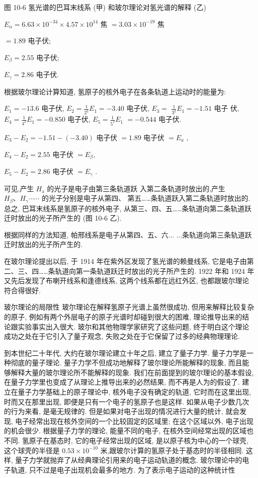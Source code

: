 \documentclass[10pt]{article}
\begin{document}
图 10-6 氢光谱的巴耳末线系 (甲) 和玻尔理论对氢光谱的解释 (乙)

\({E}_{\alpha } = {6.63} \times {10}^{-{34}} \times {4.57} \times {10}^{14}\) 焦 \(= {3.03} \times {10}^{-{19}}\) 焦

\(= {1.89}\) 电子伏;

\({E}_{\beta } = {2.55}\) 电子伏;

\({E}_{\gamma } = {2.86}\) 电子伏.

根据玻尔理论计算知道, 氢原子的核外电子在各条轨道上运动时的能量为:

\({E}_{1} = - {13.6}\) 电子伏, \({E}_{2} = \frac{1}{{2}^{2}}{E}_{1} = - {3.40}\) 电子伏, \({E}_{3} =\) \(\frac{1}{{3}^{2}}{E}_{1} = - {1.51}\) 电子 伏, \({E}_{4} = \frac{1}{{4}^{2}}{E}_{1} = - {0.850}\) 电子伏, \({E}_{5} = \frac{1}{{5}^{2}}{E}_{1}\) \(= - {0.544}\) 电子伏.

\({E}_{3} - {E}_{2} = - {1.51} - \left( {-{3.40}}\right)\) 电子伏 \(= {1.89}\) 电子伏 \(= {E}_{a}\) ,

\({E}_{4} - {E}_{2} = {2.55}\) 电子伏 \(= {E}_{\beta },\)

\({E}_{5} - {E}_{2} = {2.86}\) 电子伏 \(= {E}_{\gamma }\) .

可见,产生 \({H}_{\mathrm{a}}\) 的光子是电子由第三条轨道跃 入第二条轨道时放出的,产生 \({H}_{\beta }\text{、}{H}_{\gamma }\cdots \cdots\) 的光子分别是电子从第四、 第五……条轨道跃入第二条轨道时放出的. 总之, 巴耳末线系是氢原子的核外电子, 从第三、四、五……条轨道向第二条轨道跃迁时放出的光子所产生的 (图 10-6 乙).

根据同样的方法知道, 帕邢线系是电子从第四、五、六... ...条轨道向第三条轨道跃迁时放出的光子所产生的.

在玻尔理论提出以后, 于 1914 年在紫外区发现了氢光谱的赖曼线系, 它是电子由第二、三、四……条轨道向第一条轨道跃迁时放出的光子所产生的. 1922 年和 1924 年又先后发现了布喇开线系和逢德线系, 这两个线系都在远红外区, 也都跟玻尔理论符合得很好.

玻尔理论的局限性 玻尔理论在解释氢原子光谱上虽然很成功, 但用来解释比较复杂的原子, 例如有两个外层电子的原子光谱时却碰到很大的困难, 理论推导出来的结论跟实验事实出入很大. 玻尔和其他物理学家研究了这些问题, 终于明白这个理论成功之处在于它引入了量子观念, 失败之处在于它保留了过多的经典物理理论.

到本世纪二十年代, 大约在玻尔理论建立十年之后, 建立了量子力学. 量子力学是一种彻底的量子理论. 量子力学不但成功地解释了玻尔理论所能解释的现象, 而且能够解释大量的玻尔理论所不能解释的现象. 我们在前面提到的玻尔理论的基本假设, 在量子力学里也变成了从理论上推导出来的必然结果, 而不再是人为的假设了. 建立在量子力学基础上的原子理论中, 核外电子没有确定的轨道, 它时而在这里出现, 时而又在那里出现, 即便是只有一个电子的氢原子也是这样. 如果从电子少数几次的行为来看, 是毫无规律的. 但是如果对电子出现的情况进行大量的统计, 就会发现, 电子经常出现在核外空间的一个比较固定的区域里; 在这个区域以外, 电子出现的机会很少. 根据量子力学的理论, 能量不同的电子, 在核外空间经常出现的区域也不同. 氢原子在基态时, 它的电子经常出现的区域, 是以原子核为中心的一个球壳, 这个球壳的半径是 \({0.53} \times {10}^{-{10}}\) 米,跟玻尔计算的氢原子处于基态时的半径相同. 这样, 量子力学就抛弃了从经典理论引用来的电子运动轨道的概念. 玻尔理论中的电子轨道, 只不过是电子出现机会最多的地方. 为了表示电子运动的这种统计性
\end{document}
